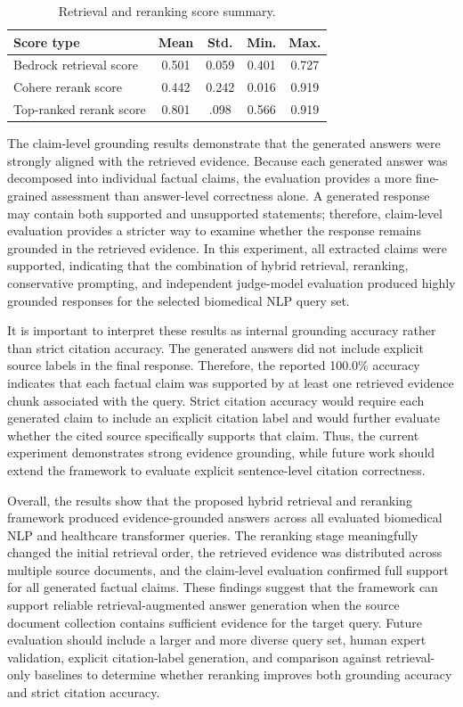 \begin{table}[!t]
\centering
\caption{Retrieval and reranking score summary.}
\label{tab:score_summary}
\begin{tabular}{lcccc}
\hline
\textbf{Score type} & \textbf{Mean} & \textbf{Std.} & \textbf{Min.} & \textbf{Max.} \\
\hline
Bedrock retrieval score & 0.501 & 0.059 & 0.401 & 0.727 \\
Cohere rerank score & 0.442 & 0.242 & 0.016 & 0.919 \\
Top-ranked rerank score & 0.801 & .098 & 0.566 & 0.919 \\
\hline
\end{tabular}
\end{table}

The claim-level grounding results demonstrate that the generated answers were strongly aligned with the retrieved evidence. Because each generated answer was decomposed into individual factual claims, the evaluation provides a more fine-grained assessment than answer-level correctness alone. A generated response may contain both supported and unsupported statements; therefore, claim-level evaluation provides a stricter way to examine whether the response remains grounded in the retrieved evidence. In this experiment, all extracted claims were supported, indicating that the combination of hybrid retrieval, reranking, conservative prompting, and independent judge-model evaluation produced highly grounded responses for the selected biomedical NLP query set.

It is important to interpret these results as internal grounding accuracy rather than strict citation accuracy. The generated answers did not include explicit source labels in the final response. Therefore, the reported 100.0\% accuracy indicates that each factual claim was supported by at least one retrieved evidence chunk associated with the query. Strict citation accuracy would require each generated claim to include an explicit citation label and would further evaluate whether the cited source specifically supports that claim. Thus, the current experiment demonstrates strong evidence grounding, while future work should extend the framework to evaluate explicit sentence-level citation correctness.

Overall, the results show that the proposed hybrid retrieval and reranking framework produced evidence-grounded answers across all evaluated biomedical NLP and healthcare transformer queries. The reranking stage meaningfully changed the initial retrieval order, the retrieved evidence was distributed across multiple source documents, and the claim-level evaluation confirmed full support for all generated factual claims. These findings suggest that the framework can support reliable retrieval-augmented answer generation when the source document collection contains sufficient evidence for the target query. Future evaluation should include a larger and more diverse query set, human expert validation, explicit citation-label generation, and comparison against retrieval-only baselines to determine whether reranking improves both grounding accuracy and strict citation accuracy.



